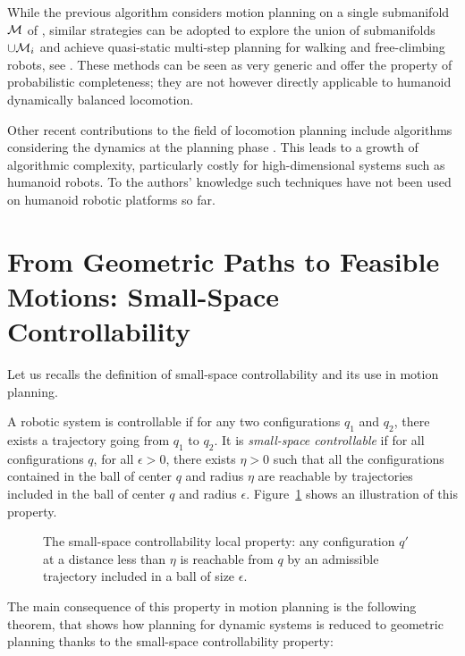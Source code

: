 While the previous algorithm considers motion planning on a single
submanifold $\mathcal{M}$ of \cspace, similar strategies can be adopted
to explore the union of submanifolds $\cup\mathcal{M}_{i}$ and achieve
quasi-static multi-step planning for walking and free-climbing robots,
see \cite{bretl2006motion, haus10}. These methods can
be seen as very generic and offer the property of probabilistic
completeness; they are not however directly applicable to humanoid
dynamically balanced locomotion.

Other recent contributions to the field of locomotion planning include
algorithms considering the dynamics at the planning phase
\cite{glassman2010quadratic, shkolnik2011bounding}. This leads to a
growth of algorithmic complexity, particularly costly for
high-dimensional systems such as humanoid robots. To the authors'
knowledge such techniques have not been used on humanoid robotic
platforms so far.

\section{From Geometric Paths to Feasible Motions: Small-Space Controllability}
\label{sec:ssc} 

Let us recalls the definition of small-space controllability and its
use in motion planning.

A robotic system is controllable if for any two configurations $q_1$
and $q_2$, there exists a trajectory going from $q_1$ to $q_2$.  It is
\textit{small-space controllable} if for all configurations $q$, for
all $\epsilon >0$, there exists $\eta >0$ such that all the
configurations contained in the ball of center $q$ and radius $\eta$
are reachable by trajectories included in the ball of center $q$ and
radius $\epsilon$. Figure~\ref{fig:ssc1} shows an illustration of this
property.

\begin{figure}
  \centering
  

  \caption{The small-space controllability local property:  any configuration $q'$ 
    at a distance less than
    $\eta$ is reachable from $q$ by an admissible trajectory included in
    a ball of size $\epsilon$.}
  \label{fig:ssc1}
\end{figure}

The main consequence of this property in motion planning is the
following theorem, that shows how planning for dynamic systems is
reduced to geometric planning thanks to the small-space
controllability property:

